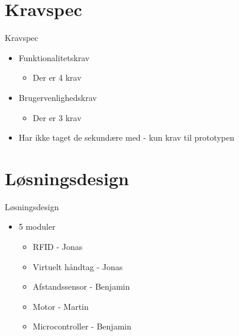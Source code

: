 \documentclass{beamer}
\begin{document}

\section{Kravspec}
\begin{frame}{Kravspec}
\begin{itemize}
\item Funktionalitetskrav
\begin{itemize}
\item Der er 4 krav
\end{itemize}
\item Brugervenlighedskrav
\begin{itemize}
\item Der er 3 krav
\end{itemize}
\item Har ikke taget de sekundære med - kun krav til prototypen
\end{itemize}
\end{frame}


\section{Løsningsdesign}
\begin{frame}{Løsningsdesign}
\begin{itemize}
\item 5 moduler
\begin{itemize}
\item RFID - Jonas
\item Virtuelt håndtag - Jonas
\item Afstandssensor - Benjamin
\item Motor - Martin
\item Microcontroller - Benjamin
\end{itemize}
\end{itemize}
\end{frame}
\end{document}

